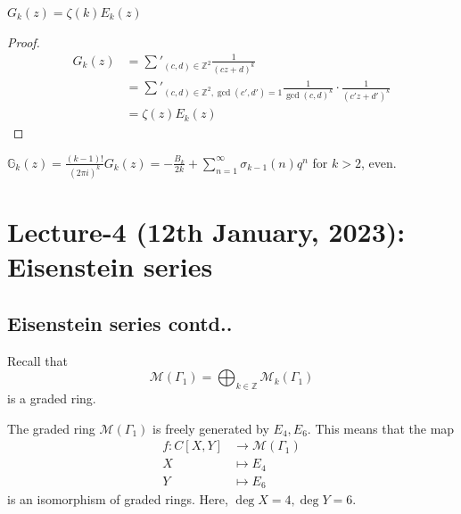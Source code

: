 \documentclass[oneside, 12pt]{scrbook}
\newcommand{\ZZ}{\mathbb Z}
\newcommand{\Mm}{\mathcal{M}}
\theoremstyle{theorem}
\begin{document}
\begin{proposition}
$G_{k}(z) = \zeta(k) E_{k}(z)$
\end{proposition}

\begin{proof}
\begin{align*}
G_{k}(z) &= \sum'_{(c,d) \in \ZZ^2} \frac{1}{(cz+d)^k} \\
&= \sum'_{(c,d)\in \ZZ^2, \gcd(c',d')=1} \frac{1}{\gcd(c,d)^k}\cdot \frac{1}{(c'z + d')^k} \\
&= \zeta(z)E_{k}(z)
\end{align*}
\end{proof}

\begin{proposition}
$\mathbb{G}_{k}(z) = \frac{(k-1)!}{(2 \pi i)^k} G_{k}(z) = -\frac{B_{k}}{2k} + \sum_{n=1}^{\infty} \sigma_{k-1}(n)q^n$ for $k>2$, even.
\end{proposition}

\chapter{Lecture-4 (12th January, 2023): Eisenstein series}

\section{Eisenstein series contd..}

Recall that $$\Mm(\Gamma_{1}) = \bigoplus_{k \in \ZZ}\Mm_{k}(\Gamma_{1})$$  is a graded ring.

\begin{proposition}
The graded ring $\Mm(\Gamma_{1})$ is freely generated by $E_{4},E_{6}$. This means that the map 
\begin{align*}
f: C[X,Y] &\rightarrow \Mm(\Gamma_{1})\\
X &\mapsto E_{4} \\
Y &\mapsto E_{6}
\end{align*}
is an isomorphism of graded rings. Here, $\deg X = 4, \deg Y=6$. 
\end{proposition}
\end{document}
